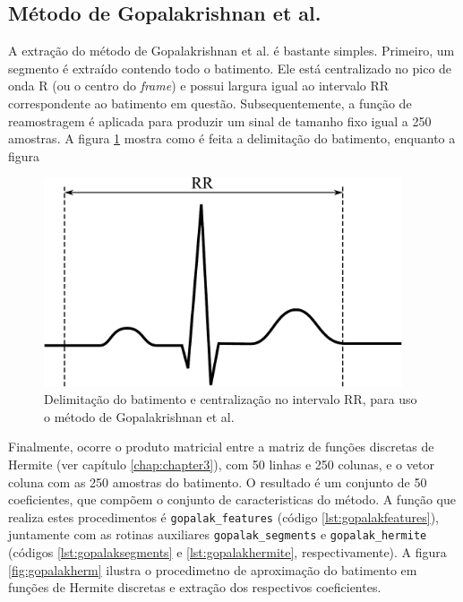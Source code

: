 \subsection*{Método de Gopalakrishnan et al.}
A extração do método de Gopalakrishnan et al. é bastante simples. Primeiro, um segmento é extraído contendo todo o batimento. Ele está centralizado no pico de onda R (ou o centro do \emph{frame}) e possui largura igual ao intervalo RR correspondente ao batimento em questão. Subsequentemente, a função de reamostragem é aplicada para produzir um sinal de tamanho fixo igual a 250 amostras. A figura \ref{fig:gopalakseg} mostra como é feita a delimitação do batimento, enquanto a figura 

\begin{figure}[ht]
    \centering
    \includegraphics[width=300pt]{figures/chap6-gopalak-segment.pdf}
    \caption[Delimitação do batimento e centralização no intervalo RR]{Delimitação do batimento e centralização no intervalo RR, para uso o método de Gopalakrishnan et al.}
    \label{fig:gopalakseg}
\end{figure}

Finalmente, ocorre o produto matricial entre a matriz de funções discretas de Hermite (ver capítulo \ref{chap:chapter3}), com 50 linhas e 250 colunas, e o vetor coluna com as 250 amostras do batimento. O resultado é um conjunto de 50 coeficientes, que compõem o conjunto de caracteristicas do método. A função que realiza estes procedimentos é \texttt{gopalak\_features} (código \ref{lst:gopalakfeatures}), juntamente com as rotinas auxiliares \texttt{gopalak\_segments} e \texttt{gopalak\_hermite} (códigos \ref{lst:gopalaksegments} e \ref{lst:gopalakhermite}, respectivamente). A figura \ref{fig:gopalakherm} ilustra o procedimetno de aproximação do batimento em funções de Hermite discretas e extração dos respectivos coeficientes.

